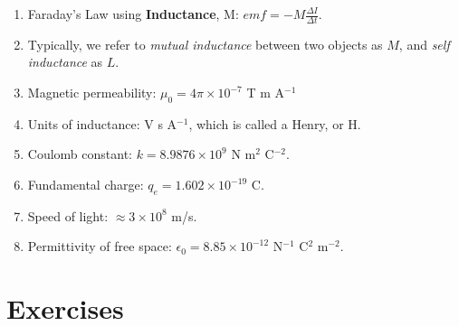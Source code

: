 \documentclass[10pt]{article}
\begin{document}
\begin{enumerate}
\item Faraday's Law using \textbf{Inductance}, M: $emf = -M \frac{\Delta I}{\Delta t}$.
\item Typically, we refer to \textit{mutual inductance} between two objects as $M$, and \textit{self inductance} as $L$.
\item Magnetic permeability: $\mu_0 = 4\pi \times 10^{-7}$ T m A$^{-1}$
\item Units of inductance: V s A$^{-1}$, which is called a Henry, or H.
\item Coulomb constant: $k = 8.9876 \times 10^{9}$ N m$^2$ C$^{-2}$.
\item Fundamental charge: $q_e = 1.602 \times 10^{-19}$ C.
\item Speed of light: $\approx 3 \times 10^{8}$ m/s.
\item Permittivity of free space: $\epsilon_0 = 8.85 \times 10^{-12}$ N$^{-1}$ C$^2$ m$^{-2}$.
\end{enumerate}

\clearpage

\section{Exercises}
\end{document}
